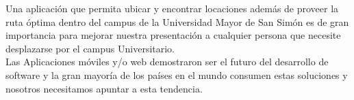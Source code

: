   Una aplicación que permita ubicar y encontrar locaciones además de proveer la ruta óptima dentro del campus de la Universidad Mayor de San Simón es de gran importancia para mejorar nuestra presentación a cualquier persona que necesite desplazarse por el campus Universitario.\\


  Las Aplicaciones móviles y/o web demostraron ser el futuro del desarrollo de software y la gran mayoría de los países en el mundo consumen estas soluciones y nosotros necesitamos apuntar a esta tendencia.\\











